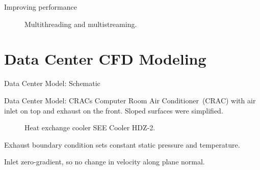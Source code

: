 \documentclass{beamer}
\begin{document}
\begin{frame}{Improving performance}
\begin{figure}[!htb]
\hspace*{-0.3in}
\centering
\begin{tiny}
\def\svgwidth{1.1\linewidth}

\end{tiny}
\caption{Multithreading and multistreaming.}
\label{fig:threads}
\end{figure}
\end{frame}


\section{Data Center CFD Modeling}
\begin{frame}{Data Center Model: Schematic}
\begin{figure}[!htb]
\centering
\begin{tiny} %
\def\svgwidth{1.1\linewidth}
\scalebox{.7}{}
\end{tiny}
\label{fig:floor_plan}
\end{figure}
\end{frame}

\begin{frame}{Data Center Model: CRACs}
Computer Room Air Conditioner~(CRAC) with air inlet on top and exhaust on the front. Sloped surfaces were simplified.
\begin{figure}[!htb]
\centering
\begin{scriptsize} %
\def\svgwidth{0.4\linewidth}

\end{scriptsize}
\caption{Heat exchange cooler SEE Cooler HDZ-2.}
\label{fig:crac}
\end{figure}
Exhaust boundary condition sets constant static pressure and temperature. 

Inlet zero-gradient, so no change in velocity along plane normal.
\end{frame}
\end{document}

